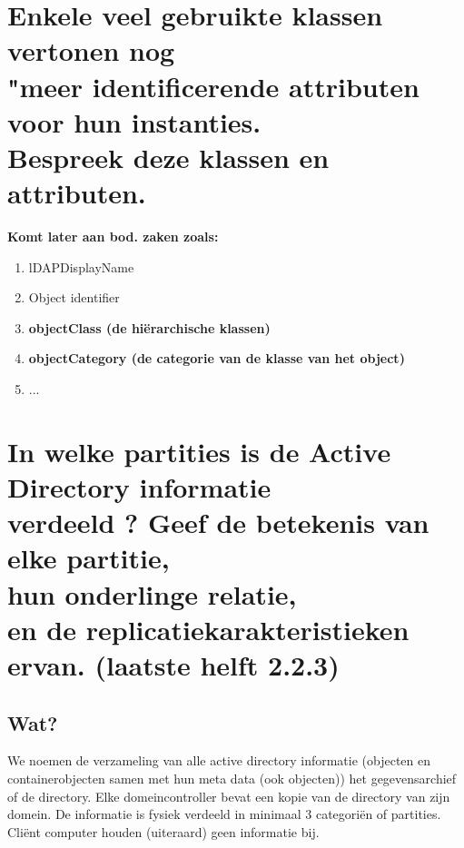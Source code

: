 \section{Enkele veel gebruikte klassen vertonen nog \\ "meer identificerende attributen voor hun instanties.\\ Bespreek deze klassen en attributen.}

\textbf{Komt later aan bod. zaken zoals:}
\begin{enumerate}
\item lDAPDisplayName
\item Object identifier
\item \textbf{objectClass (de hi\"erarchische klassen)}
\item \textbf{objectCategory (de categorie van de klasse van het object)}
\item ... 
\end{enumerate}

\clearpage
\section{In welke partities is de Active Directory informatie\\ verdeeld ? Geef de betekenis van elke partitie,\\ hun onderlinge relatie,\\ en de replicatiekarakteristieken ervan. (laatste helft 2.2.3)}

\subsection{Wat?}
We noemen de verzameling van alle active directory informatie (objecten en containerobjecten samen met hun meta data (ook objecten)) het gegevensarchief of de directory. Elke domeincontroller bevat een kopie van de directory van zijn domein. De informatie is fysiek verdeeld in minimaal 3 categori\"en of partities. Cli\"ent computer houden (uiteraard) geen informatie bij.

